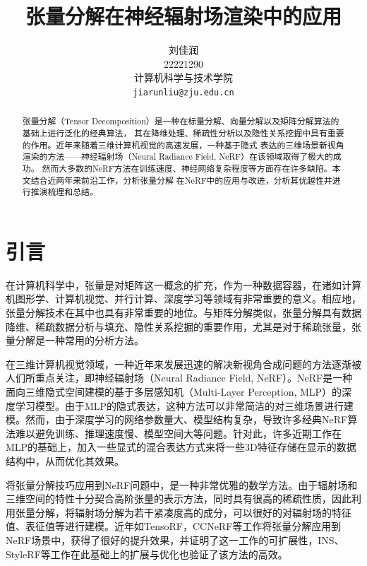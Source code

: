 \documentclass[10pt,twocolumn,letterpaper]{article}
\begin{document}
\title{张量分解在神经辐射场渲染中的应用}

\author{刘佳润\\
    22221290\\
    计算机科学与技术学院\\
    {\tt\small jiarunliu@zju.edu.cn}
}
\maketitle

\begin{abstract}
  张量分解（Tensor Decomposition）是一种在标量分解、向量分解以及矩阵分解算法的基础上进行泛化的经典算法，
  其在降维处理、稀疏性分析以及隐性关系挖掘中具有重要的作用。近年来随着三维计算机视觉的高速发展，一种基于隐式
  表达的三维场景新视角渲染的方法——神经辐射场（Neural Radiance Field, NeRF）在该领域取得了极大的成功。
  然而大多数的NeRF方法在训练速度、神经网络复杂程度等方面存在许多缺陷。本文结合近两年来前沿工作，分析张量分解
  在NeRF中的应用与改进，分析其优越性并进行推演梳理和总结。
\end{abstract}

\section{引言}
\label{sec:intro}
在计算机科学中，张量是对矩阵这一概念的扩充，作为一种数据容器，在诸如计算机图形学、计算机视觉、并行计算、深度学习等领域有非常重要的意义。相应地，张量分解技术在其中也具有非常重要的地位。与矩阵分解类似，张量分解具有数据降维、稀疏数据分析与填充、隐性关系挖掘的重要作用，尤其是对于稀疏张量，张量分解\cite{kolda2009tensor}是一种常用的分析方法。

在三维计算机视觉领域，一种近年来发展迅速的解决新视角合成问题的方法逐渐被人们所重点关注，即神经辐射场（Neural Radiance Field, NeRF）\cite{mildenhall2021nerf}。NeRF是一种面向三维隐式空间建模的基于多层感知机（Multi-Layer Perception, MLP）的深度学习模型。由于MLP的隐式表达，这种方法可以非常简洁的对三维场景进行建模。然而，由于深度学习的网络参数量大、模型结构复杂，导致许多经典NeRF算法难以避免训练、推理速度慢、模型空间大等问题。针对此，许多近期工作在MLP的基础上，加入一些显式的混合表达方式来将一些3D特征存储在显示的数据结构中，从而优化其效果。

将张量分解技巧应用到NeRF问题中，是一种非常优雅的数学方法。由于辐射场和三维空间的特性十分契合高阶张量的表示方法，同时具有很高的稀疏性质，因此利用张量分解，将辐射场分解为若干紧凑度高的成分，可以很好的对辐射场的特征值、表征值等进行建模。近年如TensoRF\cite{chen2022tensorf}，CCNeRF\cite{tang2022ccnerf}等工作将张量分解应用到NeRF场景中，获得了很好的提升效果，并证明了这一工作的可扩展性，INS\cite{li2023instant}、StyleRF\cite{liu2023stylerf}等工作在此基础上的扩展与优化也验证了该方法的高效。
\end{document}
